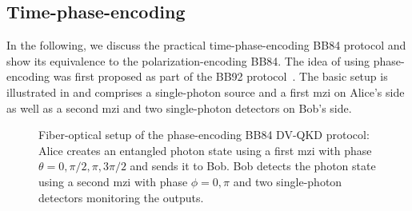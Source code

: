 \FloatBarrier
\subsection{Time-phase-encoding}

In the following, we discuss the practical time-phase-encoding BB84 protocol and show its equivalence to the polarization-encoding BB84.
The idea of using phase-encoding was first proposed as part of the BB92 protocol~\cite{Bennett1992}.
The basic setup is illustrated in  and comprises a single-photon source and a first \gls{mzi} on Alice's side as well as a second \gls{mzi} and two single-photon detectors on Bob's side.
\begin{figure}[htb]
	\centering
	
	\caption{Fiber-optical setup of the phase-encoding BB84 DV-QKD protocol: Alice creates an entangled photon state using a first \gls{mzi} with phase $\theta=0,\pi/2,\pi,3\pi/2$ and sends it to Bob. Bob detects the photon state using a second \gls{mzi} with phase $\phi=0,\pi$ and two single-photon detectors monitoring the outputs.}\label{fig:qubit_time_phase_active}
\end{figure}

